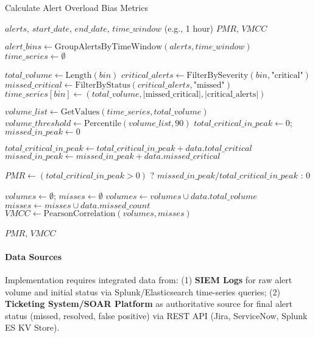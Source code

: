 \documentclass[11pt, a4paper]{article}
\begin{document}
\begin{algorithm}[H]
\caption{Calculate Alert Overload Bias Metrics}
\begin{algorithmic}[1]
\Require $alerts$, $start\_date$, $end\_date$, $time\_window$ (e.g., 1 hour)
\Ensure $PMR$, $VMCC$

\State $alert\_bins \gets \text{GroupAlertsByTimeWindow}(alerts, time\_window)$
\State $time\_series \gets \emptyset$

    \State $total\_volume \gets \text{Length}(bin)$
    \State $critical\_alerts \gets \text{FilterBySeverity}(bin, \text{"critical"})$
    \State $missed\_critical \gets \text{FilterByStatus}(critical\_alerts, \text{"missed"})$
    \State $time\_series[bin] \gets (total\_volume, |\text{missed\_critical}|, |\text{critical\_alerts}|)$
\EndFor

\State $volume\_list \gets \text{GetValues}(time\_series, total\_volume)$
\State $volume\_threshold \gets \text{Percentile}(volume\_list, 90)$
\State $total\_critical\_in\_peak \gets 0$; $missed\_in\_peak \gets 0$

        \State $total\_critical\_in\_peak \gets total\_critical\_in\_peak + data.total\_critical$
        \State $missed\_in\_peak \gets missed\_in\_peak + data.missed\_critical$
    \EndIf
\EndFor

\State $PMR \gets (total\_critical\_in\_peak > 0)$ ? $missed\_in\_peak / total\_critical\_in\_peak$ : $0$

\State $volumes \gets \emptyset$; $misses \gets \emptyset$
    \State $volumes \gets volumes \cup data.total\_volume$
    \State $misses \gets misses \cup data.missed\_count$
\EndFor
\State $VMCC \gets \text{PearsonCorrelation}(volumes, misses)$

\State \Return $PMR$, $VMCC$
\end{algorithmic}
\end{algorithm}

\paragraph{Data Sources}
Implementation requires integrated data from: (1) \textbf{SIEM Logs} for raw alert volume and initial status via Splunk/Elasticsearch time-series queries; (2) \textbf{Ticketing System/SOAR Platform} as authoritative source for final alert status (missed, resolved, false positive) via REST API (Jira, ServiceNow, Splunk ES KV Store).
\end{document}
